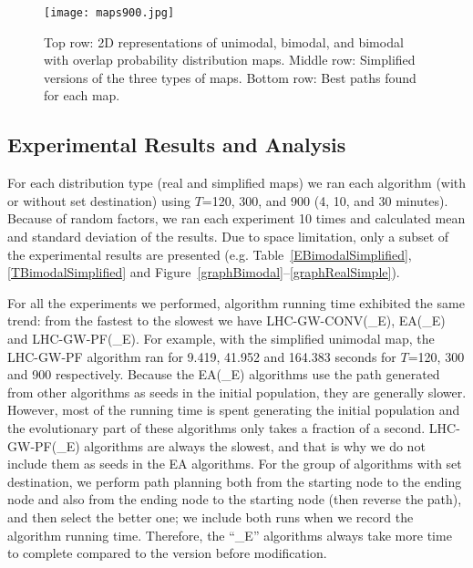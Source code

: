 \begin{figure}
\centering
\texttt{[image: maps900.jpg]}
\caption{Top row: 2D representations of unimodal, bimodal, and bimodal with overlap probability distribution maps. Middle row: Simplified versions of the three types of maps. Bottom row: Best paths found for each map.}
\label{maps}
\vspace*{-4ex}
\end{figure}


\subsection{Experimental Results and Analysis}

For each distribution type (real and simplified maps) we ran each algorithm (with or without set destination) using $T$=120, 300, and 900 (4, 10, and 30 minutes). Because of random factors, we ran each experiment 10 times and calculated mean and standard deviation of the results. Due to space limitation, only a subset of the experimental results are presented (e.g. Table~\ref{EBimodalSimplified}, \ref{TBimodalSimplified} and Figure~\ref{graphBimodal}--\ref{graphRealSimple}).

For all the experiments we performed, algorithm running time exhibited the same trend: from the fastest to the slowest we have LHC-GW-CONV(\_E), EA(\_E) and LHC-GW-PF(\_E). For example, with the simplified unimodal map, the LHC-GW-PF algorithm ran for 9.419, 41.952 and 164.383 seconds for $T$=120, 300 and 900 respectively. Because the EA(\_E) algorithms use the path generated from other algorithms as seeds in the initial population, they are generally slower. However, most of the running time is spent generating the initial population and the evolutionary part of these algorithms only takes a fraction of a second. LHC-GW-PF(\_E) algorithms are always the slowest, and that is why we do not include them as seeds in the EA algorithms. For the group of algorithms with set destination, we perform path planning both from the starting node to the ending node and also from the ending node to the starting node (then reverse the path), and then select the better one; we include both runs when we record the algorithm running time. Therefore, the ``\_E'' algorithms always take more time to complete compared to the version before modification.


